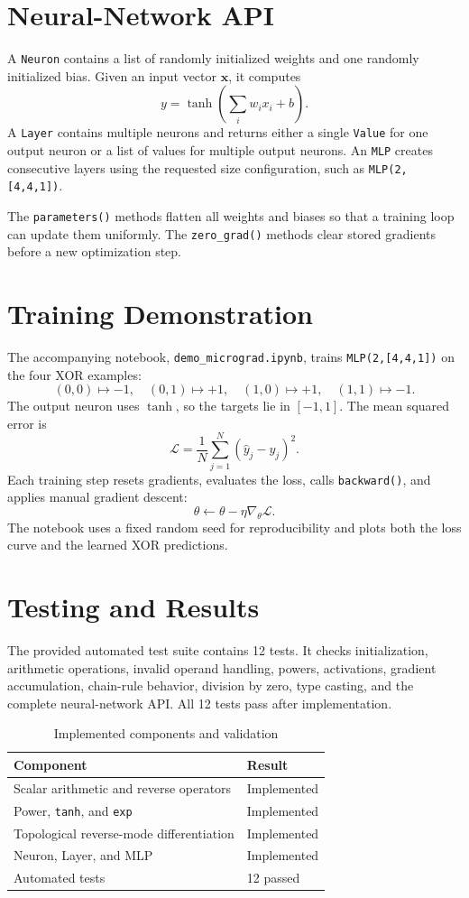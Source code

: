 \documentclass[11pt,a4paper]{article}
\begin{document}
\section{Neural-Network API}
A \texttt{Neuron} contains a list of randomly initialized weights and one
randomly initialized bias. Given an input vector $\boldsymbol{x}$, it computes
\[
y=\tanh\left(\sum_i w_i x_i+b\right).
\]
A \texttt{Layer} contains multiple neurons and returns either a single
\texttt{Value} for one output neuron or a list of values for multiple output
neurons. An \texttt{MLP} creates consecutive layers using the requested size
configuration, such as \texttt{MLP(2,[4,4,1])}.

The \texttt{parameters()} methods flatten all weights and biases so that a
training loop can update them uniformly. The \texttt{zero\_grad()} methods
clear stored gradients before a new optimization step.

\section{Training Demonstration}
The accompanying notebook, \texttt{demo\_micrograd.ipynb}, trains
\texttt{MLP(2,[4,4,1])} on the four XOR examples:
\[
(0,0)\mapsto -1,\quad
(0,1)\mapsto +1,\quad
(1,0)\mapsto +1,\quad
(1,1)\mapsto -1.
\]
The output neuron uses $\tanh$, so the targets lie in $[-1,1]$. The mean
squared error is
\[
\mathcal{L}=\frac{1}{N}\sum_{j=1}^{N}(\hat{y}_j-y_j)^2.
\]
Each training step resets gradients, evaluates the loss, calls
\texttt{backward()}, and applies manual gradient descent:
\[
\theta \leftarrow \theta-\eta\nabla_\theta\mathcal{L}.
\]
The notebook uses a fixed random seed for reproducibility and plots both the
loss curve and the learned XOR predictions.

\section{Testing and Results}
The provided automated test suite contains 12 tests. It checks initialization,
arithmetic operations, invalid operand handling, powers, activations,
gradient accumulation, chain-rule behavior, division by zero, type casting,
and the complete neural-network API. All 12 tests pass after implementation.

\begin{table}[h]
\centering
\caption{Implemented components and validation}
\begin{tabular}{ll}
\toprule
Component & Result\\
\midrule
Scalar arithmetic and reverse operators & Implemented\\
Power, \texttt{tanh}, and \texttt{exp} & Implemented\\
Topological reverse-mode differentiation & Implemented\\
Neuron, Layer, and MLP & Implemented\\
Automated tests & 12 passed\\
\bottomrule
\end{tabular}
\end{table}
\end{document}
